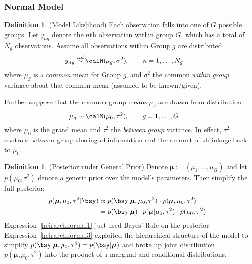\documentclass[12pt]{article}
\theoremstyle{plain}
\theoremstyle{definition}
\newtheorem{defn}[thm]{Definition}
\theoremstyle{remark}
\newcommand{\bsmu}{\boldsymbol{\mu}}
\newcommand{\iid}{\overset{iid}{\sim}}
\begin{document}
\subsubsection{Normal Model}

\begin{defn}(Model Likelihood)
Each observation falls into one of $G$ possible groups.
Let $y_{ng}$ denote the $n$th observation within group $G$, which has a
total of $N_g$ observations. Assume all observations within Group $g$
are distributed
\begin{align*}
   y_{ng} &\iid \calN(\mu_g, \sigma^2), \qquad n = 1, \ldots, N_g
\end{align*}
where $\mu_g$ is a \emph{common} mean for Group $g$, and $\sigma^2$ the
common \emph{within group} variance about that common mean (assumed to
be known/given).

Further suppose that the common group means $\mu_g$ are drawn from
distribution
\begin{align*}
   \mu_g &\sim \calN(\mu_0, \tau^2), \qquad g = 1, \ldots, G
\end{align*}
where $\mu_0$ is the grand mean and $\tau^2$ the \emph{between group}
variance. In effect, $\tau^2$ controls between-group sharing of
information and the amount of shrinkage back to $\mu_0$.
\end{defn}

\begin{defn}(Posterior under General Prior)
Denote $\bsmu:=(\mu_1,\ldots,\mu_G)$ and let $p(\mu_0,\tau^2)$ denote a
generic prior over the model's parameters.
Then simplify the full posterior:
\begin{align}
  p(\bsmu,\mu_0,\tau^2|\bsy)
  &\propto
  p(\bsy|\bsmu,\mu_0,\tau^2)
  \cdot p(\bsmu,\mu_0,\tau^2)
  \label{heirarchnormal1}
  \\
  &=
  p(\bsy|\bsmu)
  \cdot p(\bsmu|\mu_0,\tau^2)
  \cdot p(\mu_0,\tau^2)
  \label{heirarchnormal3}
\end{align}
Expression~\ref{heirarchnormal1} just used Bayes' Rule on the posterior.
Expression~\ref{heirarchnormal3} exploited the hierarchical structure of
the model to simplify $ p(\bsy|\bsmu,\mu_0,\tau^2) = p(\bsy|\bsmu)$ and
broke up
joint distribution $p(\bsmu,\mu_0,\tau^2)$ into the product of a
marginal and conditional distributions.
\end{defn}
\end{document}
